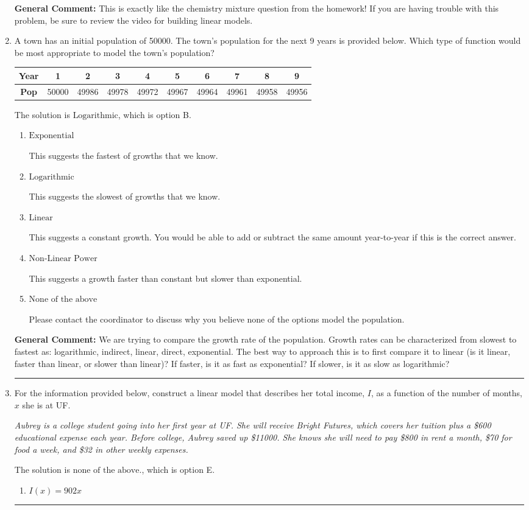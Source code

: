 \documentclass{extbook}[14pt]
\newcommand{\litem}[1]{\item #1

\rule{\textwidth}{0.4pt}}
\begin{document}
\begin{enumerate}
{\textbf{General Comment:} This is exactly like the chemistry mixture question from the homework! If you are having trouble with this problem, be sure to review the video for building linear models.
}
\litem{
A town has an initial population of 50000. The town's population for the next 9 years is provided below. Which type of function would be most appropriate to model the town's population?


\begin{tabular}{c|c|c|c|c|c|c|c|c|c}
\textbf{Year} &1 &2 &3 &4 &5 &6 &7 &8 &9\tabularnewline \hline
\textbf{Pop} &50000 &49986 &49978 &49972 &49967 &49964 &49961 &49958 &49956\end{tabular}The solution is \( \text{Logarithmic} \), which is option B.\begin{enumerate}[label=\Alph*.]
\item \( \text{Exponential} \)

This suggests the fastest of growths that we know.
\item \( \text{Logarithmic} \)

This suggests the slowest of growths that we know.
\item \( \text{Linear} \)

This suggests a constant growth. You would be able to add or subtract the same amount year-to-year if this is the correct answer.
\item \( \text{Non-Linear Power} \)

This suggests a growth faster than constant but slower than exponential.
\item \( \text{None of the above} \)

Please contact the coordinator to discuss why you believe none of the options model the population.
\end{enumerate}

\textbf{General Comment:} We are trying to compare the growth rate of the population. Growth rates can be characterized from slowest to fastest as: logarithmic, indirect, linear, direct, exponential. The best way to approach this is to first compare it to linear (is it linear, faster than linear, or slower than linear)? If faster, is it as fast as exponential? If slower, is it as slow as logarithmic?
}
\litem{
For the information provided below, construct a linear model that describes her total income, $I$, as a function of the number of months, $x$ she is at UF.

\begin{center}
    \textit{ Aubrey is a college student going into her first year at UF. She will receive Bright Futures, which covers her tuition plus a \$600 educational expense each year. Before college, Aubrey saved up \$11000. She knows she will need to pay \$800 in rent a month, \$70 for food a week, and \$32 in other weekly expenses. }
\end{center}
The solution is \( \text{none of the above.} \), which is option E.\begin{enumerate}[label=\Alph*.]
\item \( I(x) = 902 x \)


\end{enumerate}}
\end{enumerate}
\end{document}
